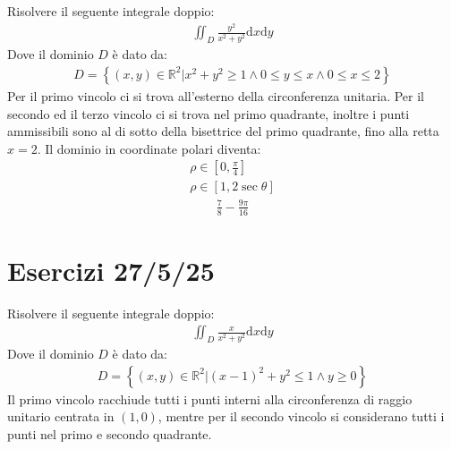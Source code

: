 \documentclass{article}
\newcommand{\df}{\mathrm{d}}
\numberwithin{equation}{subsection}
\begin{document}
Risolvere il seguente integrale doppio:
\begin{gather*}
    \iint_D\frac{y^2}{x^2+y^2}\df x\df y
\end{gather*}
Dove il dominio $D$ è dato da:
\begin{gather*}
    D=\left\{(x,y)\in\mathbb{R}^2\big| x^2+y^2\geq1\land0\leq y\leq x\land 0\leq x\leq2\right\}
\end{gather*}
Per il primo vincolo ci si trova all'esterno della circonferenza unitaria. Per il secondo ed il terzo vincolo ci si trova nel primo quadrante, inoltre i punti ammissibili sono al di sotto della bisettrice del primo quadrante, fino alla retta $x=2$. 
Il dominio in coordinate polari diventa:
\begin{gather*}
    \rho\in\left[0,\frac{\pi}{4}\right]\\
    \rho\in[1,2\sec\theta]
\end{gather*}
\begin{gather*}
    \frac{7}{8}-\frac{9\pi}{16}
\end{gather*}

\clearpage

\section{Esercizi 27/5/25}

Risolvere il seguente integrale doppio:
\begin{gather*}
    \iint_D\frac{x}{x^2+y^2}\df x\df y
\end{gather*}
Dove il dominio $D$ è dato da:
\begin{gather*}
    D=\left\{(x,y)\in\mathbb{R}^2\big|(x-1)^2+y^2\leq1\land y\geq0\right\}
\end{gather*}
Il primo vincolo racchiude tutti i punti interni alla circonferenza di raggio unitario centrata in $(1,0)$, mentre per il secondo vincolo si considerano tutti i punti nel primo e secondo quadrante. 
\end{document}
